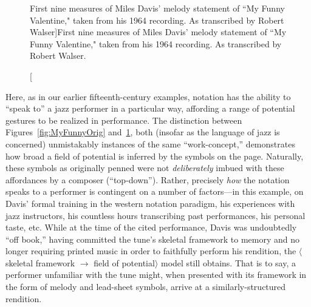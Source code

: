         \begin{figure}
            \centering
            \captionsetup{width=.5\textwidth}
            \caption[First nine measures of Miles Davis' melody statement of ``My Funny Valentine," taken from his 1964 recording. As transcribed by Robert Walser]{First nine measures of Miles Davis' melody statement of ``My Funny Valentine," taken from his 1964 recording. As transcribed by Robert Walser.\footnotemark}
            \label{fig:MyFunnyDavis}
        \end{figure}

    Here, as in our earlier fifteenth-century examples, notation has the ability to ``speak to'' a jazz performer in a particular way, affording a range of potential gestures to be realized in performance. The distinction between Figures~\ref{fig:MyFunnyOrig} and~\ref{fig:MyFunnyDavis}, both (insofar as the language of jazz is concerned) unmistakably instances of the same ``work-concept,'' demonstrates how broad a field of potential is inferred by the symbols on the page. Naturally, these symbols as originally penned were not \textit{deliberately} imbued with these affordances by a composer (``top-down''). Rather, precisely \textit{how} the notation speaks to a performer is contingent on a number of factors---in this example, on Davis' formal training in the western notation paradigm, his experiences with jazz instructors, his countless hours transcribing past performances, his personal taste, etc. While at the time of the cited performance, Davis was undoubtedly ``off book,'' having committed the tune's skeletal framework to memory and no longer requiring printed music in order to faithfully perform his rendition, the $\langle$skeletal framework $\rightarrow$ field of potential$\rangle$ model still obtains. That is to say, a performer unfamiliar with the tune might, when presented with its framework in the form of melody and lead-sheet symbols, arrive at a similarly-structured rendition.


